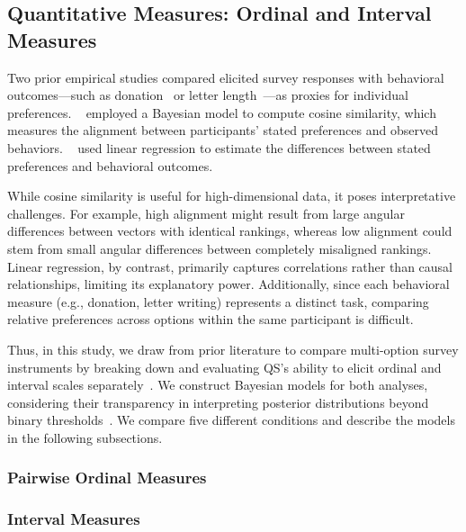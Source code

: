 \subsection{Quantitative Measures: Ordinal and Interval Measures}
\label{sec:quantitative_measures}
Two prior empirical studies compared elicited survey responses with behavioral outcomes—such as donation~\cite{chengCanShowWhat2021,cavaille2024cares} or letter length~\cite{cavaille2024cares}—as proxies for individual preferences. ~\citet{chengCanShowWhat2021} employed a Bayesian model to compute cosine similarity, which measures the alignment between participants' stated preferences and observed behaviors. ~\citet{cavaille2024cares} used linear regression to estimate the differences between stated preferences and behavioral outcomes.

While cosine similarity is useful for high-dimensional data, it poses interpretative challenges. For example, high alignment might result from large angular differences between vectors with identical rankings, whereas low alignment could stem from small angular differences between completely misaligned rankings. Linear regression, by contrast, primarily captures correlations rather than causal relationships, limiting its explanatory power. Additionally, since each behavioral measure (e.g., donation, letter writing) represents a distinct task, comparing relative preferences across options within the same participant is difficult.

Thus, in this study, we draw from prior literature to compare multi-option survey instruments by breaking down and evaluating QS’s ability to elicit ordinal and interval scales separately~\cite{collewetPreferenceEstimationPoint2023}. We construct Bayesian models for both analyses, considering their transparency in interpreting posterior distributions beyond binary thresholds~\cite{mcelreath2018statistical, kay2016researcher}. We compare five different conditions and describe the models in the following subsections.

\subsubsection{Pairwise Ordinal Measures}
\label{sec:ordinal_measures}


\subsubsection{Interval Measures}
\label{sec:interval_measures}


